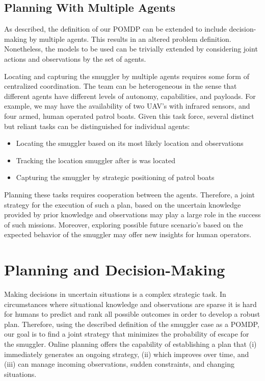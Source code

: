 \documentclass[conference]{IEEEtran}
\begin{document}
\subsection{Planning With Multiple Agents}
\label{sub:plan-mult-ag}

As described, the definition of our POMDP can be extended to include decision-making by multiple agents. This results in an altered problem definition. Nonetheless, the models to be used can be trivially extended by considering joint actions and observations by the set of agents.

Locating and capturing the smuggler by multiple agents requires some form of centralized coordination. The team can be heterogeneous in the sense that different agents have different levels of autonomy, capabilities, and payloads. For example, we may have the availability of two UAV's with infrared sensors, and four armed, human operated patrol boats. Given this task force, several distinct but reliant tasks can be distinguished for individual agents:
\begin{itemize}
\item Locating the smuggler based on its most likely location and observations
\item Tracking the location smuggler after is was located
\item Capturing the smuggler by strategic positioning of patrol boats
\end{itemize}
Planning these tasks requires cooperation between the agents. Therefore, a joint strategy for the execution of such a plan, based on the uncertain knowledge provided by prior knowledge and observations may play a large role in the success of such missions. Moreover, exploring possible future scenario's based on the expected behavior of the smuggler may offer new insights for human operators.

\section{Planning and Decision-Making}
\label{sec:ma-dec-mak}

Making decisions in uncertain situations is a complex strategic task. In circumstances where situational knowledge and observations are sparse it is hard for humans to predict and rank all possible outcomes in order to develop a robust plan. Therefore, using the described definition of the smuggler case as a POMDP, our goal is to find a joint strategy that minimizes the probability of escape for the smuggler. Online planning offers the capability of establishing a plan that (i) immediately generates an ongoing strategy, (ii) which improves over time, and (iii) can manage incoming observations, sudden constraints, and changing situations. 
\end{document}
